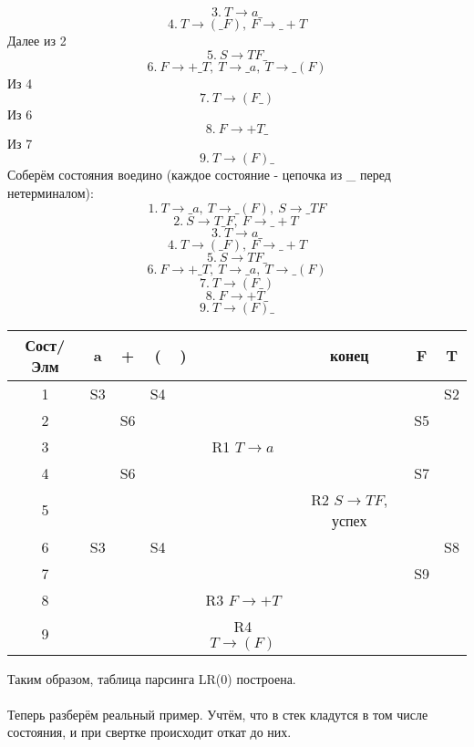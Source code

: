 \documentclass{article}
\begin{document}
$$3. \ T\to a\_$$
$$4. \ T\to (\_F), \ F\to \_+T$$
Далее из 2
$$5. \ S\to TF\_$$
$$6. \ F\to +\_T, \ T\to \_a, \ T\to \_(F)$$
Из 4
$$7. \ T\to (F\_)$$
Из 6
$$8. \ F\to +T\_$$
Из 7
$$9.\ T\to (F)\_$$
Соберём состояния воедино 
(каждое состояние - цепочка из \_ перед нетерминалом):
$$1. \ T\to \_a, \ T\to \_(F), \ S\to \_TF$$
$$2. \ S\to T\_F, \ F\to \_+T \  $$
$$3. \ T\to a\_$$
$$4. \ T\to (\_F), \ F\to \_+T$$
$$5. \ S\to TF\_$$
$$6. \ F\to +\_T, \ T\to \_a, \ T\to \_(F)$$
$$7. \ T\to (F\_)$$
$$8. \ F\to +T\_$$
$$9.\ T\to (F)\_$$
\begin{center}
  \begin{tabular}{ c|c|c|c|c|c|c|c|c }
    Сост/Элм & a & + & ( & ) & & конец & F & T \\
    \hline
    1    & S3 &  & S4  &   & &  & & S2 \\
    \hline
    2    &  & S6 &  &   &  & & S5 & \\
    \hline
    3    & & & & & R1 $T\to a$ \\
    \hline
    4    & & S6 &  &   &  & & S7 &  \\
    \hline
    5   & & & & & & R2 $S\to TF$, успех &  \\
    \hline
    6    & S3 &  & S4  &   &  & & & S8\\ 
    \hline
    7    & &  &  &   & & & S9  & \\
    \hline
    8   & & & & & R3 $F\to +T$  \\
    \hline
    9  & & & & & R4 $T\to (F)$    \\  
  \end{tabular}
\end{center}
Таким образом, таблица парсинга LR(0) построена.\\\\
Теперь разберём реальный пример. Учтём, что в стек кладутся в том числе 
состояния, и при свертке происходит откат до них.\\
\end{document}
